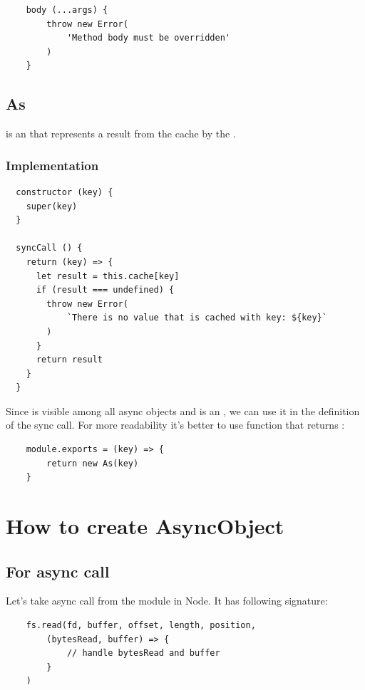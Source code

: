 \documentclass{article}
\begin{document}
\begin{verbatim}
    body (...args) {
        throw new Error(
            'Method body must be overridden'
        )
    }
\end{verbatim}

\subsection{As}

 is an  that represents a result from the cache by the .

\subsubsection{Implementation}

\begin{verbatim}
  constructor (key) {
    super(key)
  }
  
  syncCall () {
    return (key) => {
      let result = this.cache[key]
      if (result === undefined) {
        throw new Error(
            `There is no value that is cached with key: ${key}`
        )
      }
      return result
    }
  }
\end{verbatim}

Since  is visible among all async objects and  is an , we can use it in the definition of the sync call. For more readability it's better to use function  that returns :

\begin{verbatim}
    module.exports = (key) => {
        return new As(key)
    }
\end{verbatim}

\vspace*{10px}

\section{How to create AsyncObject}

\subsection{For async call}

Let's take async call  from the  module in Node. It has following signature:

\begin{verbatim}
    fs.read(fd, buffer, offset, length, position,
        (bytesRead, buffer) => {
            // handle bytesRead and buffer
        }
    )
\end{verbatim}
\end{document}
